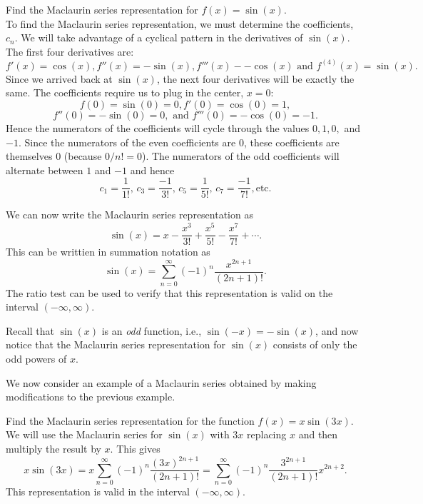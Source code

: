 \documentclass{ximera}
\begin{document}
\begin{example} 
Find the Maclaurin series representation for $f(x) = \sin(x)$.\\
To find the Maclaurin series representation, we must determine the coefficients, $c_n$. 
We will take advantage of a cyclical pattern in the derivatives of $\sin(x)$.
The first four derivatives are:
\[
f'(x) = \cos(x), f''(x) = -\sin(x), f'''(x) - -\cos(x) \text{ and } f^{(4)}(x) = \sin(x).
\]
Since we arrived back at $\sin(x)$, the next four derivatives will be exactly the same.
The coefficients require us to plug in the center, $x = 0$:
\[
f(0) = \sin(0) = 0, f'(0) = \cos(0) = 1,
\]
\[
 f''(0) = -\sin(0) = 0, \text{ and } f'''(0) = -\cos(0) = -1.
\]
Hence the numerators of the coefficients will cycle through the values $0, 1, 0,$ and $-1$.
Since the numerators of the even coefficients are 0, these coefficients are themselves 0 (because $0/n! = 0$).
The numerators of the odd coefficients will alternate between $1$ and $-1$ and hence 
\[
c_1 = \frac{1}{1!},\, c_3 = \frac{-1}{3!},\, c_5 = \frac{1}{5!}, \, c_7 = \frac{-1}{7!}, \text{etc}.
\]

We can now write the Maclaurin series representation as
\[
\sin(x) =  x - \frac{x^3}{3!} + \frac{x^5}{5!} - \frac{x^7}{7!} + \cdots.
\]
This can be writtien in summation notation as
\[
\sin(x) = \sum_{n=0}^\infty (-1)^n\frac{x^{2n+1}}{(2n+1)!}.
\]
The ratio test can be used to verify that this representation is valid on the interval $(-\infty, \infty)$.
\begin{remark}
Recall that $\sin(x)$ is an \textit{odd} function, 
i.e., $\sin(-x) = -\sin(x)$, and now notice that the Maclaurin series representation for $\sin(x)$ consists of only the 
odd powers of $x$. 
\end{remark}
\end{example}


We now consider an example of a Maclaurin series obtained by making modifications to the previous example.


\begin{example}[example 5]
Find the Maclaurin series representation for the function $f(x) = x\sin(3x)$.\\
We will use the Maclaurin series for $\sin(x)$ with $3x$ replacing $x$ and then multiply the result by $x$.
This gives
\[
x\sin(3x) = x \sum_{n=0}^\infty (-1)^n\frac{(3x)^{2n+1}}{(2n+1)!} = \sum_{n=0}^\infty (-1)^n \frac{3^{2n+1}}{(2n+1)!}x^{2n+2}.
\]
This representation is valid in the interval $(-\infty, \infty)$.
\end{example}
\end{document}
